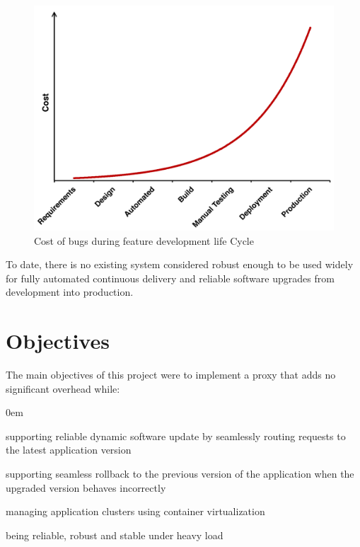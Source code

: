 \documentclass[a4paper,11pt,twoside]{report}
\begin{document}
\begin{figure}[!ht]
  \centering
     \includegraphics[scale=0.25]{cost_of_bugs}
  \caption{Cost of bugs during  feature development life Cycle}
  \label{cost}
\end{figure}

\setlength{\leftskip}{0pt}
\setlength{\rightskip}{0pt}
\noindent 
To date, there is no existing system considered robust enough to be used widely for fully automated continuous delivery and reliable software upgrades from development into production.
 
\section{Objectives}
The main objectives of this project were to implement a proxy that adds no significant overhead while:
\begin{list}{-}{}
\itemsep0em
\item supporting reliable dynamic software update by seamlessly routing requests to the latest application version
\item supporting seamless rollback to the previous version of the application when the upgraded version behaves incorrectly  
\item managing application clusters using container virtualization
\item being reliable, robust and stable under heavy load
\end{list}
 
\end{document}
